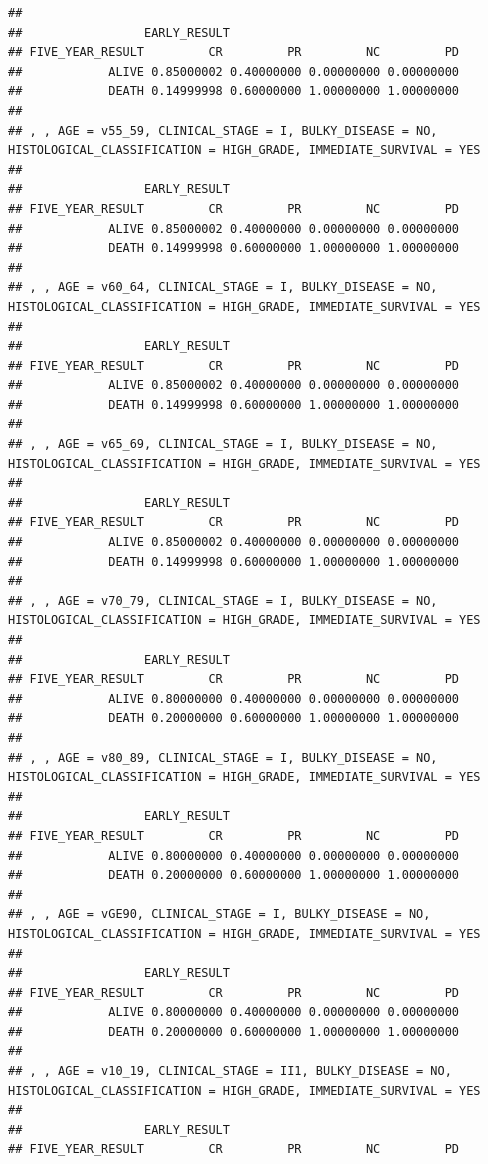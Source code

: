 \documentclass[]{article}
\begin{document}
\begin{verbatim}
## 
##                 EARLY_RESULT
## FIVE_YEAR_RESULT         CR         PR         NC         PD
##            ALIVE 0.85000002 0.40000000 0.00000000 0.00000000
##            DEATH 0.14999998 0.60000000 1.00000000 1.00000000
## 
## , , AGE = v55_59, CLINICAL_STAGE = I, BULKY_DISEASE = NO, HISTOLOGICAL_CLASSIFICATION = HIGH_GRADE, IMMEDIATE_SURVIVAL = YES
## 
##                 EARLY_RESULT
## FIVE_YEAR_RESULT         CR         PR         NC         PD
##            ALIVE 0.85000002 0.40000000 0.00000000 0.00000000
##            DEATH 0.14999998 0.60000000 1.00000000 1.00000000
## 
## , , AGE = v60_64, CLINICAL_STAGE = I, BULKY_DISEASE = NO, HISTOLOGICAL_CLASSIFICATION = HIGH_GRADE, IMMEDIATE_SURVIVAL = YES
## 
##                 EARLY_RESULT
## FIVE_YEAR_RESULT         CR         PR         NC         PD
##            ALIVE 0.85000002 0.40000000 0.00000000 0.00000000
##            DEATH 0.14999998 0.60000000 1.00000000 1.00000000
## 
## , , AGE = v65_69, CLINICAL_STAGE = I, BULKY_DISEASE = NO, HISTOLOGICAL_CLASSIFICATION = HIGH_GRADE, IMMEDIATE_SURVIVAL = YES
## 
##                 EARLY_RESULT
## FIVE_YEAR_RESULT         CR         PR         NC         PD
##            ALIVE 0.85000002 0.40000000 0.00000000 0.00000000
##            DEATH 0.14999998 0.60000000 1.00000000 1.00000000
## 
## , , AGE = v70_79, CLINICAL_STAGE = I, BULKY_DISEASE = NO, HISTOLOGICAL_CLASSIFICATION = HIGH_GRADE, IMMEDIATE_SURVIVAL = YES
## 
##                 EARLY_RESULT
## FIVE_YEAR_RESULT         CR         PR         NC         PD
##            ALIVE 0.80000000 0.40000000 0.00000000 0.00000000
##            DEATH 0.20000000 0.60000000 1.00000000 1.00000000
## 
## , , AGE = v80_89, CLINICAL_STAGE = I, BULKY_DISEASE = NO, HISTOLOGICAL_CLASSIFICATION = HIGH_GRADE, IMMEDIATE_SURVIVAL = YES
## 
##                 EARLY_RESULT
## FIVE_YEAR_RESULT         CR         PR         NC         PD
##            ALIVE 0.80000000 0.40000000 0.00000000 0.00000000
##            DEATH 0.20000000 0.60000000 1.00000000 1.00000000
## 
## , , AGE = vGE90, CLINICAL_STAGE = I, BULKY_DISEASE = NO, HISTOLOGICAL_CLASSIFICATION = HIGH_GRADE, IMMEDIATE_SURVIVAL = YES
## 
##                 EARLY_RESULT
## FIVE_YEAR_RESULT         CR         PR         NC         PD
##            ALIVE 0.80000000 0.40000000 0.00000000 0.00000000
##            DEATH 0.20000000 0.60000000 1.00000000 1.00000000
## 
## , , AGE = v10_19, CLINICAL_STAGE = II1, BULKY_DISEASE = NO, HISTOLOGICAL_CLASSIFICATION = HIGH_GRADE, IMMEDIATE_SURVIVAL = YES
## 
##                 EARLY_RESULT
## FIVE_YEAR_RESULT         CR         PR         NC         PD

\end{verbatim}
\end{document}
